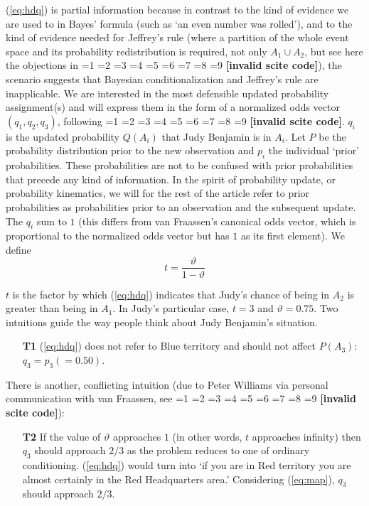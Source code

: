 \documentclass[smallextended]{svjour3}       %
\newcommand{\nial}{\noindent} %
\newcommand{\nonsc}[1]{}
\newcommand{\qnull}[1]{`#1'}
\newcommand{\qvu}[0]{\vartheta}
\newcommand{\PageP}{p.~}
\newcommand{\PageP}{}
\newcommand{\scite}[3]{\ifnum#1=1\cite{#2}\else
\ifnum#1=2\cite[{\PageP}~#3]{#2}\else
\ifnum#1=3\cite[{\PageP}~#3]{#2}\else
\ifnum#1=4\cite{#2}\else
\ifnum#1=5\cite{#2}\else
\ifnum#1=6\cite[{\PageP}~#3]{#2}\else
\ifnum#1=7\cite{#2}\else
\ifnum#1=8\cite[{\PageP}~#3]{#2}\else
\ifnum#1=9\cite[{\PageP}~#3]{#2}\else
\textbf{[invalid scite code]}\fi\fi\fi\fi\fi\fi\fi\fi\fi}
\begin{document}
\nial ({\ref{eq:hdq}}) is partial information because in contrast to
the kind of evidence we are used to in Bayes' formula (such as
\qnull{an even number was rolled}), and to the kind of evidence needed
for Jeffrey's rule (where a partition of the whole event space and its
probability redistribution is required, not only $A_{1}\cup{}A_{2}$,
but see here the objections in \scite{7}{douvenromeijn09}{}), the
scenario suggests that Bayesian conditionalization and Jeffrey's rule
are inapplicable. We are interested in the most defensible updated
probability assignment(s) and will express them in the form of a
normalized odds vector $(q_{1},q_{2},q_{3})$, following
\scite{1}{fraassen81}{}. $q_{i}$ is the updated probability $Q(A_{i})$
that Judy Benjamin is in $A_{i}$. Let $P$ be the probability
distribution prior to the new observation and $p_{i}$ the individual
\qnull{prior} probabilities. These probabilities are not to be
confused with prior probabilities that precede any kind of
information. In the spirit of probability update, or probability
kinematics, we will for the rest of the article refer to prior
probabilities as probabilities prior to an observation and the
subsequent update. The $q_{i}$ sum to $1$ (this differs from van
Fraassen's canonical odds vector, which is proportional to the
normalized odds vector but has $1$ as its first element). We define
\begin{displaymath}
  t=\frac{{\qvu}}{1-{\qvu}}
\end{displaymath}

\nial $t$ is the factor by which ({\ref{eq:hdq}}) indicates that
Judy's chance of being in $A_{2}$ is greater than being in $A_{1}$. In
Judy's particular case, $t=3$ and ${\qvu}=0.75$. Two intuitions guide
the way people think about Judy Benjamin's situation.

\begin{enumerate}
  \item[\textbf{T1}] ({\ref{eq:hdq}}) does not refer to Blue territory and
  should not affect $P(A_{3})$: $q_{3}=p_{3}(=0.50)$.
\end{enumerate}

\nial There is another, conflicting intuition (due to Peter Williams
via personal communication with van Fraassen, see
\scite{8}{fraassen81}{379})\nonsc{}:

\begin{enumerate}
\item[\textbf{T2}] If the value of ${\qvu}$ approaches $1$ (in other words,
  $t$ approaches infinity) then $q_{3}$ should approach $2/3$ as the
  problem reduces to one of ordinary conditioning. ({\ref{eq:hdq}})
  would turn into \qnull{if you are in Red territory you are almost
    certainly in the Red Headquarters area.} Considering
  ({\ref{eq:map}}), $q_{3}$ should approach $2/3$. 
\end{enumerate}
\end{document}
